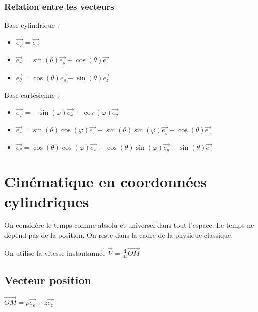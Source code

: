 \documentclass[french]{yLectureNote}
\renewcommand{\vec}{\overrightarrow}
\newcommand{\dd}{\mathrm{d}}
\begin{document}
\subsubsection{Relation entre les vecteurs}
Base cylindrique :
\begin{itemize}
 \item $\vec{e_{\varphi}} = \vec{e_{\varphi}}$
 \item $\vec{e_{r}} = \sin(\theta) \vec{e_{\rho}} + \cos(\theta) \vec{e_z}$
 \item $\vec{e_{\theta}} = \cos(\theta) \vec{e_{\rho}} -\sin(\theta) \vec{e_z}$
\end{itemize}
Base cartésienne :
\begin{itemize}
 \item $\vec{e_{\varphi}} = -\sin(\varphi)\vec{e_x} + \cos(\varphi)\vec{e_y}$
 \item $\vec{e_{r}} = \sin(\theta)\cos(\varphi) \vec{e_x} + \sin(\theta)\sin(\varphi) \vec{e_y}+\cos(\theta)\vec{e_z}$
 \item $\vec{e_{\theta}} = \cos(\theta)\cos(\varphi) \vec{e_x} +\cos(\theta)\sin(\varphi) \vec{e_y} - \sin(\theta)\vec{e_z}$
\end{itemize}
\section{Cinématique en coordonnées cylindriques}
On considère le temps comme absolu et universel dans tout l'espace. Le temps ne dépend pas de la position. On reste dans la cadre de la physique classique.

On utilise la vitesse instantannée $\vec{V} = \frac{\dd}{\dd t}\vec{OM}$

\subsection{Vecteur position}
$\vec{OM} = \rho \vec{e_{\rho}} + z\vec{e_z}$
\end{document}

